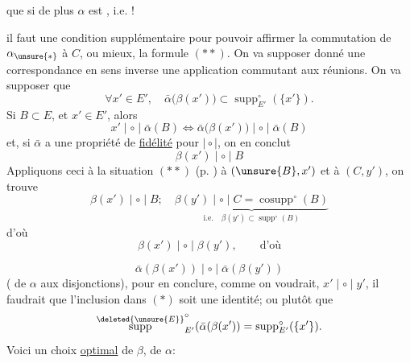 que si de plus $\alpha$ est , i.e. !

 il faut une condition supplémentaire pour pouvoir affirmer la commutation de $\alpha_{\unsure{*}}$ à $C$, ou mieux, la formule $(**)$. On va supposer donné une correspondance en sens inverse
 une application
commutant aux réunions. On va supposer que
\[
\forall x'\in E',\quad \bar\alpha\bigl(\beta(x')\bigr)\subset\operatorname{supp}^{\circ}_{E'}(\{x'\}). \tag*{$(*)$}
\]
Si $B\subset E$,  et $x'\in E'$, alors
\[
x'\mid\circ\mid\bar\alpha(B)\Longleftrightarrow\bar\alpha\bigl(\beta(x')\bigr)\mid\circ\mid\bar\alpha(B)
\]
et, si $\bar\alpha$ a une propriété de \uline{fidélité} pour $\mid\circ\mid$, on en conclut
\[
\beta(x')\mid\circ\mid B
\]
Appliquons ceci à la situation $(**)$ (p. ) à $(\unsure{B},x')$ et à $(C,y')$, on trouve
\[
\beta(x')\mid\circ\mid B;\quad
\underbrace{\beta(y')\mid\circ\mid C=\operatorname{cosupp}^{\circ}(B)}_{\text{i.e.}\quad\beta(y')\subset\operatorname{supp}^{\circ}(B)}
\]
d'où
\[
\beta(x')\mid\circ\mid\beta(y'),\qquad\text{d'où}
\]

\[
\bar\alpha(\beta(x'))\mid\circ\mid\bar\alpha(\beta(y'))
\]
( de $\alpha$ aux disjonctions), pour en conclure, comme on voudrait, $x'\mid\circ\mid y'$, il faudrait que l'inclusion dans $(*)$ soit une identité; ou plutôt que
\[
\overset{\deleted{\unsure{E}}}{\operatorname{supp}}^{\circ}_{E'}(\bar\alpha(\beta(x'))=\operatorname{supp}^{\circ}_{E'}(\{x'\}) .
\]
Voici un choix \uline{optimal} de $\beta$,  de $\alpha$:

